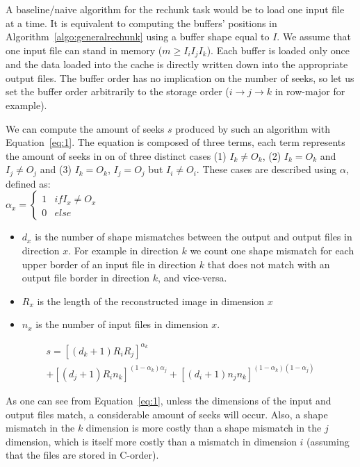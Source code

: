 \documentclass[conference]{IEEEtran}
\begin{document}
A baseline/naive algorithm for the rechunk task would be to load one input file
at a time. It is equivalent to computing the buffers' positions in
Algorithm~\ref{algo:generalrechunk} using a buffer shape equal to $I$.
We assume that one input file can stand in memory ($m \geq I_iI_jI_k$). Each
buffer is loaded only once and the data loaded into the cache is directly
written down into the appropriate output files. The buffer order has no
implication on the number of seeks, so let us set the buffer order arbitrarily
to the storage order ($i \rightarrow j \rightarrow k$ in row-major for example).

We can compute the amount of seeks $s$ produced by such an algorithm with
Equation~\ref{eq:1}. The equation is composed of three terms, each term represents
the amount of seeks in on of three distinct cases (1) $I_k \neq O_k$, (2)
$I_k = O_k$ and $I_j \neq O_j$ and (3) $I_k = O_k$, $I_j = O_j$ but $I_i \neq O_i$.
These cases are described using $\alpha$, defined as: \\
$\alpha_x = \begin{cases}
   1 & if I_x \neq O_x \\
   0 & else
\end{cases}$
\begin{itemize}
  \item $d_x$ is the number of shape mismatches between the output and output files
  in direction $x$. For example in direction $k$ we count one shape mismatch for
  each upper border of an input file in direction $k$ that does not match with
  an output file border in direction $k$, and vice-versa.
  \item $R_x$ is the length of the reconstructed image in dimension $x$
  \item $n_x$ is the number of input files in dimension $x$.
\end{itemize}

\begin{multline} \label{eq:1}
s = [(d_k+1)R_iR_j]^{\alpha_k} \\ + [(d_j+1)R_in_k]^{(1-\alpha_k)\alpha_j} + [(d_i+1)n_jn_k]^{(1-\alpha_k)(1-\alpha_j)}
\end{multline}

As one can see from Equation~\ref{eq:1}, unless the dimensions of the input and
output files match, a considerable amount of seeks will occur. Also, a shape mismatch
in the $k$ dimension is more costly than a shape mismatch in the $j$ dimension,
which is itself more costly than a mismatch in dimension $i$ (assuming that the
files are stored in C-order).
\end{document}
